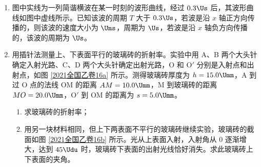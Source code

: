\documentclass[\gkver]{gaokaozhenti}
\begin{document}
\begin{enumerate}
\item
图中实线为一列简谐横波在某一时刻的波形曲线，经过 $0.3\Us$ 后，其波形曲线如图中虚线所示。已知该波的周期 $T$ 大于 $0.3\Us$，若波是沿 $x$ 轴正方向传播的，则该波的速度大小为  $\Ums$，周期为  $\Us$，若波是沿 $x$ 轴负方向传播的，该波的周期为  $\Us$。



\item
用插针法测量上、下表面平行的玻璃砖的折射率。实验中用 A、B 两个大头针确定入射光路、C、D 两个大头针确定出射光路，O 和 O$'$ 分别是入射点和出射点，如图 \ref{2021全国乙卷16a} 所示。测得玻璃砖厚度为 $h=15.0\Umm$，A 到过 O 点的法线 OM 的距离 $AM=10.0\Umm$，M 到玻璃砖的距离 $MO=20.0\Umm$，O$'$ 到 OM 的距离为 $s=5.0\Umm$。


\begin{enumerate}
	\item
	求玻璃砖的折射率；

	\item
	用另一块材料相同，但上下两表面不平行的玻璃砖继续实验，玻璃砖的截面如图 \ref{2021全国乙卷16b} 所示。光从上表面入射，入射角从 0 逐渐增大，达到 $45\Udu$ 时，玻璃砖下表面的出射光线恰好消失。求此玻璃砖上下表面的夹角。

\end{enumerate}

\end{enumerate}
\end{document}
